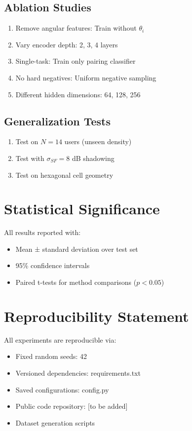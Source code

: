 \subsection{Ablation Studies}
\begin{enumerate}
    \item Remove angular features: Train without $\theta_i$
    \item Vary encoder depth: 2, 3, 4 layers
    \item Single-task: Train only pairing classifier
    \item No hard negatives: Uniform negative sampling
    \item Different hidden dimensions: 64, 128, 256
\end{enumerate}

\subsection{Generalization Tests}
\begin{enumerate}
    \item Test on $N=14$ users (unseen density)
    \item Test with $\sigma_{SF} = 8$ dB shadowing
    \item Test on hexagonal cell geometry
\end{enumerate}

\section{Statistical Significance}

All results reported with:
\begin{itemize}
    \item Mean ± standard deviation over test set
    \item 95\% confidence intervals
    \item Paired t-tests for method comparisons ($p < 0.05$)
\end{itemize}

\section{Reproducibility Statement}

All experiments are reproducible via:
\begin{itemize}
    \item Fixed random seeds: 42
    \item Versioned dependencies: requirements.txt
    \item Saved configurations: config.py
    \item Public code repository: [to be added]
    \item Dataset generation scripts
\end{itemize}
